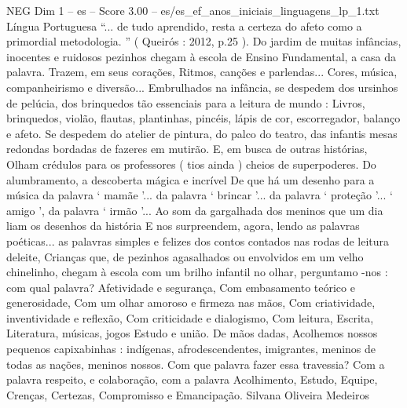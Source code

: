 \begin{textsample}{NEG Dim 1 – es – Score 3.00 – es/es\_ef\_anos\_iniciais\_linguagens\_lp\_1.txt}  \label{ex:f1_neg_097}
Língua Portuguesa “... de tudo aprendido, resta a certeza do afeto como a primordial metodologia. ” ( Queirós : 2012, p.25 ).
Do jardim de muitas infâncias, inocentes e ruidosos pezinhos chegam à escola de Ensino Fundamental, a casa da palavra.
Trazem, em seus corações, Ritmos, canções e parlendas...
Cores, música, companheirismo e diversão...
Embrulhados na infância, se despedem dos ursinhos de pelúcia, dos brinquedos tão essenciais para a leitura de mundo : Livros, brinquedos, violão, flautas, plantinhas, pincéis, lápis de cor, escorregador, balanço e afeto.
Se despedem do atelier de pintura, do palco do teatro, das infantis mesas redondas bordadas de fazeres em mutirão.
E, em busca de outras histórias, Olham crédulos para os professores ( tios ainda ) cheios de superpoderes.
Do alumbramento, a descoberta mágica e incrível De que há um desenho para a música da palavra ‘ mamãe ’... da palavra ‘ brincar ’... da palavra ‘ proteção ’... ‘ amigo ’, da palavra ‘ irmão ’...
Ao som da gargalhada dos meninos que um dia liam os desenhos da história E nos surpreendem, agora, lendo as palavras poéticas... as palavras simples e felizes dos contos contados nas rodas de leitura deleite, Crianças que, de pezinhos agasalhados ou envolvidos em um velho chinelinho, chegam à escola com um brilho infantil no olhar, perguntamo -nos : com qual palavra?
Afetividade e segurança, Com embasamento teórico e generosidade, Com um olhar amoroso e firmeza nas mãos, Com criatividade, inventividade e reflexão, Com criticidade e dialogismo, Com leitura, Escrita, Literatura, músicas, jogos Estudo e união.
De mãos dadas, Acolhemos nossos pequenos capixabinhas : indígenas, afrodescendentes, imigrantes, meninos de todas as nações, meninos nossos.
Com que palavra fazer essa travessia?
Com a palavra respeito, e colaboração, com a palavra Acolhimento, Estudo, Equipe, Crenças, Certezas, Compromisso e Emancipação.
Silvana Oliveira Medeiros

\end{textsample}
